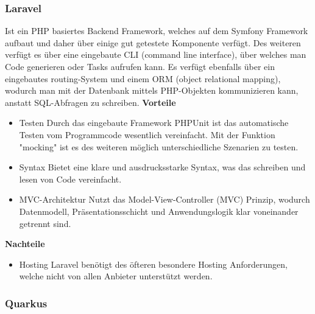 \subsubsection{Laravel}
Ist ein PHP basiertes Backend Framework, welches auf dem Symfony Framework aufbaut und daher über einige gut getestete Komponente verfügt. Des weiteren verfügt es über eine eingebaute CLI (command line interface), über welches man Code generieren oder Tasks aufrufen kann. Es verfügt ebenfalls über ein eingebautes routing-System und einem ORM (object relational mapping), wodurch man mit der Datenbank mittels PHP-Objekten kommunizieren kann, anstatt SQL-Abfragen zu schreiben.
\newline
\textbf{Vorteile}
\begin{itemize}
    \item Testen
        \newline
        Durch das eingebaute Framework PHPUnit ist das automatische Testen vom Programmcode wesentlich vereinfacht. Mit der Funktion "mocking" ist es des weiteren möglich unterschiedliche Szenarien zu testen.
    \item Syntax
        \newline
        Bietet eine klare und ausdrucksstarke Syntax, was das schreiben und lesen von Code vereinfacht.
    \item MVC-Architektur
        \newline
        Nutzt das Model-View-Controller (MVC) Prinzip, wodurch Datenmodell, Präsentationsschicht und Anwendungslogik klar voneinander getrennt sind.
\end{itemize}

\textbf{Nachteile}
\begin{itemize}
    \item Hosting
        \newline
        Laravel benötigt des öfteren besondere Hosting Anforderungen, welche nicht von allen Anbieter unterstützt werden.
\end{itemize}
\cite{backend_laravel}

\subsubsection{Quarkus}